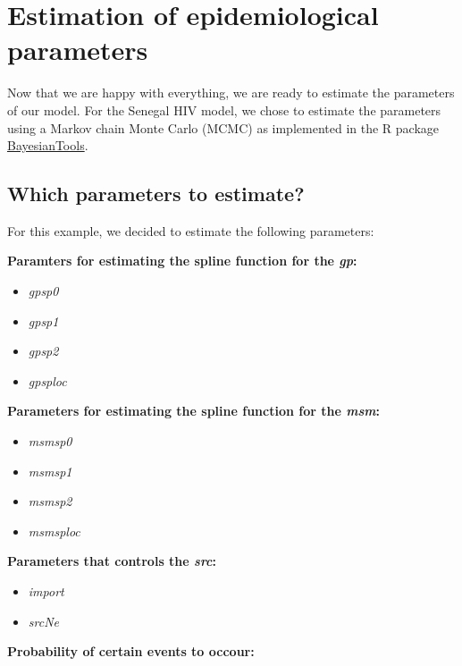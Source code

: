 \documentclass[12pt,]{article}
\providecommand{\tightlist}{%
  \setlength{\itemsep}{0pt}\setlength{\parskip}{0pt}}
\begin{document}
\hypertarget{estimation-of-epidemiological-parameters}{%
\section{Estimation of epidemiological
parameters}\label{estimation-of-epidemiological-parameters}}

Now that we are happy with everything, we are ready to estimate the
parameters of our model. For the Senegal HIV model, we chose to estimate
the parameters using a Markov chain Monte Carlo (MCMC) as implemented in
the R package
\href{\%22https://github.com/florianhartig/BayesianTools\%22}{BayesianTools}.

\hypertarget{which-parameters-to-estimate}{%
\subsection{Which parameters to
estimate?}\label{which-parameters-to-estimate}}

For this example, we decided to estimate the following parameters:

\textbf{Paramters for estimating the spline function for the \emph{gp}:}

\begin{itemize}
\tightlist
\item
  \emph{gpsp0}
\item
  \emph{gpsp1}
\item
  \emph{gpsp2}
\item
  \emph{gpsploc}
\end{itemize}

\textbf{Parameters for estimating the spline function for the
\emph{msm}:}

\begin{itemize}
\tightlist
\item
  \emph{msmsp0}
\item
  \emph{msmsp1}
\item
  \emph{msmsp2}
\item
  \emph{msmsploc}
\end{itemize}

\textbf{Parameters that controls the \emph{src}:}

\begin{itemize}
\tightlist
\item
  \emph{import}
\item
  \emph{srcNe}
\end{itemize}

\textbf{Probability of certain events to occour:}
\end{document}
